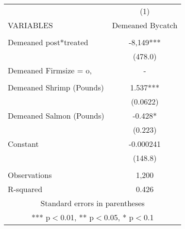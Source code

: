 \begin{tabular}{lc} \hline
 & (1) \\
VARIABLES & Demeaned Bycatch \\ \hline
 &  \\
Demeaned post*treated & -8,149*** \\
 & (478.0) \\
Demeaned Firmsize = o, & - \\
 &  \\
Demeaned Shrimp (Pounds) & 1.537*** \\
 & (0.0622) \\
Demeaned Salmon (Pounds) & -0.428* \\
 & (0.223) \\
Constant & -0.000241 \\
 & (148.8) \\
 &  \\
Observations & 1,200 \\
 R-squared & 0.426 \\ \hline
\multicolumn{2}{c}{ Standard errors in parentheses} \\
\multicolumn{2}{c}{ *** p$<$0.01, ** p$<$0.05, * p$<$0.1} \\
\end{tabular}
